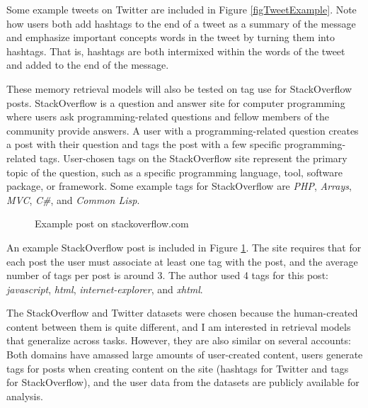 \documentclass[man,floatsintext,donotrepeattitle]{apa6}
\begin{document}
Some example tweets on Twitter are included in Figure \ref{figTweetExample}.
Note how users both add hashtags to the end of a tweet as a summary of the message and emphasize important concepts words in the tweet by turning them into hashtags.
That is, hashtags are both intermixed within the words of the tweet and added to the end of the message.

These memory retrieval models will also be tested on tag use for StackOverflow posts.
StackOverflow is a question and answer site for computer programming where users ask programming-related questions and fellow members of the community provide answers.
A user with a programming-related question creates a post with their question and tags the post with a few specific programming-related tags. 
User-chosen tags on the StackOverflow site represent the primary topic of the question, such as a specific programming language, tool, software package, or framework.
Some example tags for StackOverflow are \emph{PHP}, \emph{Arrays}, \emph{MVC}, \emph{C\#}, and \emph{Common Lisp}.

\begin{figure}[!htbp]
  \caption{Example post on stackoverflow.com}
  \label{figSOExample}
\end{figure}

An example StackOverflow post is included in Figure \ref{figSOExample}.
The site requires that for each post the user must associate at least one tag with the post, and the average number of tags per post is around 3.
The author used 4 tags for this post: \emph{javascript}, \emph{html}, \emph{internet-explorer}, and \emph{xhtml}.

The StackOverflow and Twitter datasets were chosen because the human-created content between them is quite different, and I am interested in retrieval models that generalize across tasks.
However, they are also similar on several accounts:
Both domains have amassed large amounts of user-created content, users generate tags for posts when creating content on the site (hashtags for Twitter and tags for StackOverflow),
and the user data from the datasets are publicly available for analysis.
\end{document}

